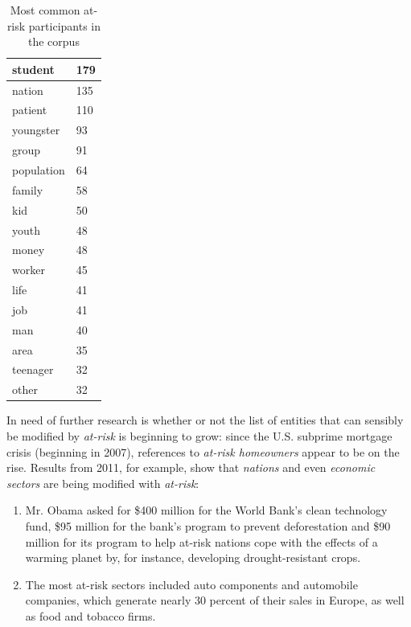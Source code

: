 \begin{table}[htb!]
{\begin{minipage}{.37\textwidth}
\begin{tabularx}{1.0\textwidth}{|X|l|}
			student    & 179   \\ \hline
			nation     & 135   \\ \hline
			patient    & 110   \\ \hline
			youngster  & 93    \\ \hline
			group      & 91    \\ \hline
			population & 64    \\ \hline
			family     & 58    \\ \hline
			kid        & 50    \\ \hline
			youth      & 48    \\ \hline
			money      & 48    \\ \hline
			worker     & 45    \\ \hline
			life       & 41    \\ \hline
			job        & 41    \\ \hline
			man        & 40    \\ \hline
			area       & 35    \\ \hline
			teenager   & 32    \\ \hline
			other & 32 \\ \hline
			\end{tabularx}
			\caption{Most common at-risk participants in the corpus}
			\label{tab:atrisk}
			\end{minipage}}%
			\end{table}

        In need of further research is whether or not the list of entities that can sensibly be modified by \emph{at-risk} is beginning to grow: since the U.S. subprime mortgage crisis (beginning in 2007), references to \emph{at-risk homeowners} appear to be on the rise. Results from 2011, for example, show that \emph{nations} and even \emph{economic sectors} are being modified with \emph{at-risk}:

        \begin{enumerate}  [before=\itshape,font=\normalfont] \setlength\itemsep{0em} \small
            \item Mr. Obama asked for \$400 million for the World Bank's clean technology fund, \$95 million for the bank's program to prevent deforestation and \$90 million for its program to help at-risk nations cope with the effects of a warming planet by, for instance, developing drought-resistant crops.
            \item The most at-risk sectors included auto components and automobile companies, which generate nearly 30 percent of their sales in Europe, as well as food and tobacco firms.
        \end{enumerate}

